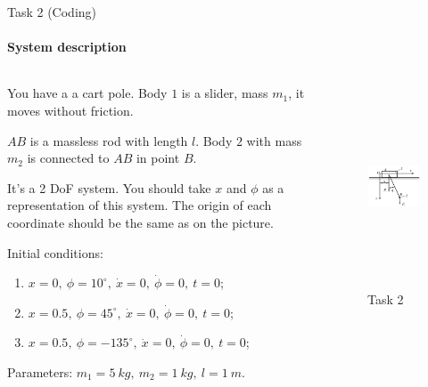 \documentclass[aspectratio=169]{beamer}
\begin{document}
  \begin{frame}[t]{Task 2 (Coding)}
  \framesubtitle{System description}
  \vspace{-0.6cm}
    \begin{columns}[T,onlytextwidth]
      \begin{column}{0.64\textwidth}
        \footnotesize
        You have a a cart pole. Body $1$ is a slider, mass $m_1$, it moves without friction.

        $AB$ is a massless rod with length $l$. Body $2$ with mass $m_2$ is connected to $AB$ in point $B$.
        \medskip

        It's a 2 DoF system. You should take $x$ and $\phi$ as a representation of this system. The origin of each coordinate should be the same as on the picture.
        \medskip

        Initial conditions:
        \begin{enumerate}
          \item $x = 0,\ \phi = 10^\circ,\ \dot{x} = 0,\ \dot{\phi} = 0,\ t=0$;
          \item $x = 0.5,\ \phi = 45^\circ,\ \dot{x} = 0,\ \dot{\phi} = 0,\ t=0$;
          \item $x = 0.5,\ \phi = -135^\circ,\ \dot{x} = 0,\ \dot{\phi} = 0,\ t=0$;
        \end{enumerate}
        Parameters: $m_1 = 5\ kg,\ m_2 = 1\ kg,\ l = 1\ m$.

      \end{column}
      \begin{column}{0.34\textwidth}
        \begin{figure}[H]
          \centering\includegraphics[height=6cm,width=1\textwidth,keepaspectratio]{HW7_2.png}
          \caption*{Task 2}
          \label{fig:HW7_2.png}
        \end{figure}
      \end{column}
    \end{columns}
  \end{frame}
\end{document}

